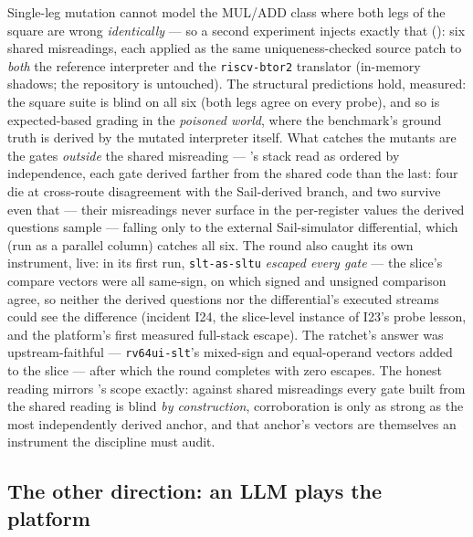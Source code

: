 Single-leg mutation cannot model the MUL/ADD class where both legs of
the square are wrong \emph{identically} --- so a second experiment
injects exactly that (): six shared misreadings,
each applied as the same uniqueness-checked source patch to \emph{both}
the reference interpreter and the \texttt{riscv-btor2} translator
(in-memory shadows; the repository is untouched). The structural
predictions hold, measured: the square suite is blind on all six (both
legs agree on every probe), and so is expected-based grading in the
\emph{poisoned world}, where the benchmark's ground truth is derived
by the mutated interpreter itself. What catches the mutants are the
gates \emph{outside} the shared misreading ---
's stack read as ordered by independence, each gate
derived farther from the shared code than the last: four die at
cross-route
disagreement with the Sail-derived branch, and two survive even that
--- their misreadings never surface in the per-register values the
derived questions sample --- falling only to the external
Sail-simulator differential, which (run as a parallel column) catches
all six. The round also caught its own instrument, live: in its first
run, \texttt{slt-as-sltu} \emph{escaped every gate} --- the slice's
compare vectors were all same-sign, on which signed and unsigned
comparison agree, so neither the derived questions nor the
differential's executed streams could see the difference (incident
I24, the slice-level instance of I23's probe lesson, and the
platform's first measured full-stack escape). The ratchet's answer
was upstream-faithful --- \texttt{rv64ui-slt}'s mixed-sign and
equal-operand vectors added to the slice --- after which the round
completes with zero escapes. The honest reading mirrors
's scope exactly: against shared misreadings every
gate built from the shared reading is blind \emph{by construction},
corroboration is only as
strong as the most independently derived anchor, and that
anchor's vectors are themselves an instrument the discipline must
audit.

\subsection{The other direction: an LLM plays the platform}
\label{sec:eval-player}



